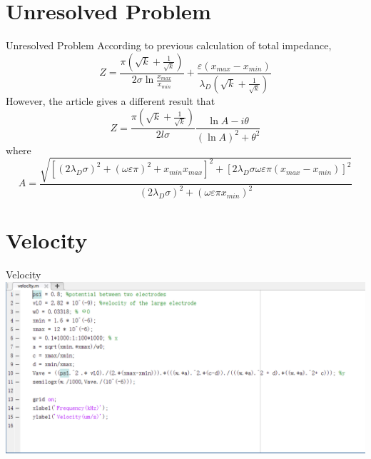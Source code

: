 \documentclass[12pt]{beamer}
\begin{document}
\section{Unresolved Problem}
\begin{frame}{Unresolved Problem}
    According to previous calculation of total impedance,\\
    \[Z=\frac{\pi\left(\sqrt{k}+\frac{1}{\sqrt{k}}\right)}{2\sigma\ln{\frac{x_{max}}{x_{min}}}}+\frac{\varepsilon\left(x_{max}-x_{min}\right)}{\lambda_D\left(\sqrt{k}+\frac{1}{\sqrt{k}}\right)}\]
    However, the article gives a different result that\\
    \[Z=\frac{\pi\left(\sqrt{k}+\frac{1}{\sqrt{k}}\right)}{2l\sigma}\frac{\ln{A}-i\theta}{(\ln{A})^2+\theta^2}\]
    where
    \[A=\frac{\sqrt{\left[\left(2\lambda_D\sigma\right)^2+(\omega\varepsilon\pi)^2+x_{min}x_{max}\right]^2+\left[2\lambda_D\sigma\omega\varepsilon\pi\left(x_{max}-x_{min}\right)\right]^2}}{\left(2\lambda_D\sigma\right)^2+(\omega\varepsilon\pi x_{min})^2}\]
\end{frame}
\section{Velocity}
\begin{frame}{Velocity}
    \includegraphics[width=0.8\linewidth]{9.png}
\end{frame}
\end{document}
